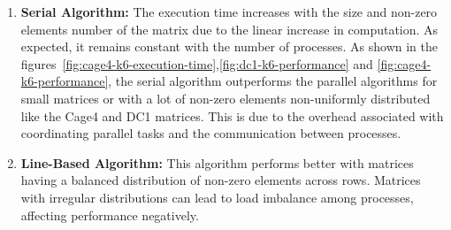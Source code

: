\documentclass[12pt,oneside]{book} %
\begin{document}
\begin{enumerate}
    \item \textbf{Serial Algorithm:}
          The execution time increases with the size and non-zero elements number
          of the matrix due to the linear increase in computation.
          As expected, it remains constant with the number of processes.
          As shown in the figures~\ref{fig:cage4-k6-execution-time},\ref{fig:dc1-k6-performance} and \ref{fig:cage4-k6-performance},
          the serial algorithm outperforms the parallel algorithms for small matrices
          or with a lot of non-zero elements non-uniformly distributed like the Cage4 and DC1 matrices.
          This is due to the overhead associated with coordinating parallel tasks and the communication between processes.
    \item \textbf{Line-Based Algorithm:}
          This algorithm performs better with matrices having a balanced
          distribution of non-zero elements across rows.
          Matrices with irregular distributions can lead to load
          imbalance among processes, affecting performance negatively.


\end{enumerate}
\end{document}
